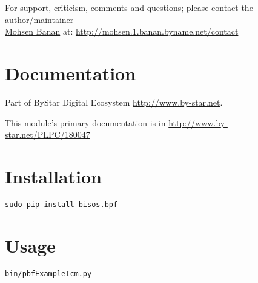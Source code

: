 \documentclass{article}
\begin{document}
For support, criticism, comments and questions; please contact the 
author/maintainer \\
\href{http://mohsen.1.banan.byname.net}{Mohsen Banan} at: \url{http://mohsen.1.banan.byname.net/contact}


\section{Documentation}

Part of ByStar Digital Ecosystem \url{http://www.by-star.net}.

This module's primary documentation is in  \url{http://www.by-star.net/PLPC/180047}

\section{Installation}

\begin{verbatim}
sudo pip install bisos.bpf
\end{verbatim}


\section{Usage}

\begin{verbatim}
bin/pbfExampleIcm.py
\end{verbatim}

\begin{comment}
*  [[elisp:(org-cycle)][| ]]  *DBLK: main-end*                                       :: [[elisp:(beginning-of-buffer)][Top]] [[elisp:(delete-other-windows)][(1)]]  [[elisp:(org-cycle)][| ]]
\end{comment}
\end{document}
